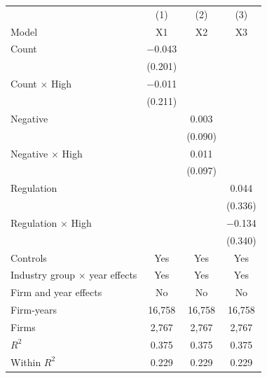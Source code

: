 \begin{tabular}{lccc}
\toprule
 & (1) & (2) & (3) \\
Model & X1 & X2 & X3 \\
\midrule
Count & $-$0.043 &  &  \\
 & (0.201) &  &  \\
Count $\times$ High & $-$0.011 &  &  \\
 & (0.211) &  &  \\
Negative &  & 0.003 &  \\
 &  & (0.090) &  \\
Negative $\times$ High &  & 0.011 &  \\
 &  & (0.097) &  \\
Regulation &  &  & 0.044 \\
 &  &  & (0.336) \\
Regulation $\times$ High &  &  & $-$0.134 \\
 &  &  & (0.340) \\
\midrule
Controls & Yes & Yes & Yes \\
Industry group $\times$ year effects & Yes & Yes & Yes \\
Firm and year effects & No & No & No \\
Firm-years & 16,758 & 16,758 & 16,758 \\
Firms & 2,767 & 2,767 & 2,767 \\
$R^2$ & 0.375 & 0.375 & 0.375 \\
Within $R^2$ & 0.229 & 0.229 & 0.229 \\
\bottomrule
\end{tabular}

